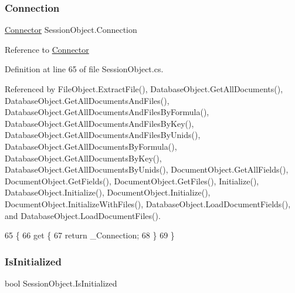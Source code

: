 \subsubsection{\texorpdfstring{Connection}{Connection}}
{\footnotesize\ttfamily \mbox{\hyperlink{class_connector}{Connector}} Session\+Object.\+Connection\hspace{0.3cm}{\ttfamily [get]}}



Reference to \mbox{\hyperlink{class_connector}{Connector}} 



Definition at line 65 of file Session\+Object.\+cs.



Referenced by File\+Object.\+Extract\+File(), Database\+Object.\+Get\+All\+Documents(), Database\+Object.\+Get\+All\+Documents\+And\+Files(), Database\+Object.\+Get\+All\+Documents\+And\+Files\+By\+Formula(), Database\+Object.\+Get\+All\+Documents\+And\+Files\+By\+Key(), Database\+Object.\+Get\+All\+Documents\+And\+Files\+By\+Unids(), Database\+Object.\+Get\+All\+Documents\+By\+Formula(), Database\+Object.\+Get\+All\+Documents\+By\+Key(), Database\+Object.\+Get\+All\+Documents\+By\+Unids(), Document\+Object.\+Get\+All\+Fields(), Document\+Object.\+Get\+Fields(), Document\+Object.\+Get\+Files(), Initialize(), Database\+Object.\+Initialize(), Document\+Object.\+Initialize(), Document\+Object.\+Initialize\+With\+Files(), Database\+Object.\+Load\+Document\+Fields(), and Database\+Object.\+Load\+Document\+Files().


\begin{DoxyCode}
65                                 \{
66         \textcolor{keyword}{get} \{
67             \textcolor{keywordflow}{return} \_Connection;
68         \}
69     \}
\end{DoxyCode}
\mbox{\label{class_session_object_ae0885b9054fc3ce287307ac16ff69990}} 
\subsubsection{\texorpdfstring{Is\+Initialized}{IsInitialized}}
{\footnotesize\ttfamily bool Session\+Object.\+Is\+Initialized\hspace{0.3cm}{\ttfamily [get]}}



